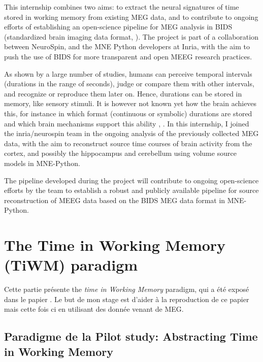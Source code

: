 This internship combines two aims: to extract the neural signatures of time stored in working memory from existing MEG data, and to contribute to ongoing efforts of establishing an open-science pipeline for MEG analysis in BIDS (standardized brain imaging data format, \cite{gorgolewski2016brain}). The project is part of a collaboration between NeuroSpin, and the MNE Python developers at Inria, with the aim to push the use of BIDS for more transparent and open MEEG research practices.

As shown by a large number of studies, humans can perceive temporal intervals (durations in the range of seconds), judge or compare them with other intervals, and recognize or reproduce them later on. Hence, durations can be stored in memory, like sensory stimuli. It is however not known yet how the brain achieves this, for instance in which format (continuous or symbolic) durations are stored and which brain mechanisms support this ability \cite{polti2018effect}, \cite{teki2014working}. In this internship, I joined the inria/neurospin team in the ongoing analysis of the previously collected MEG data, with the aim to reconstruct source time courses of brain activity from the cortex, and possibly the hippocampus and cerebellum \cite{gauthier2020hippocampal} using volume source models in MNE-Python.

The pipeline developed during the project will contribute to ongoing open-science
efforts by the team to establish a robust and publicly available pipeline for source
reconstruction of MEEG data based on the BIDS MEG data format in MNE-Python.




\section{The Time in Working Memory (TiWM) paradigm}

Cette partie présente the \textit{time in Working Memory} paradigm, qui a été exposé dans le papier \cite{herbst2021abstracting}. Le but de mon stage est d'aider à la reproduction de ce papier mais cette fois ci en utilisant des donnée venant de MEG.

\subsection{Paradigme de la Pilot study: Abstracting Time in Working Memory}

